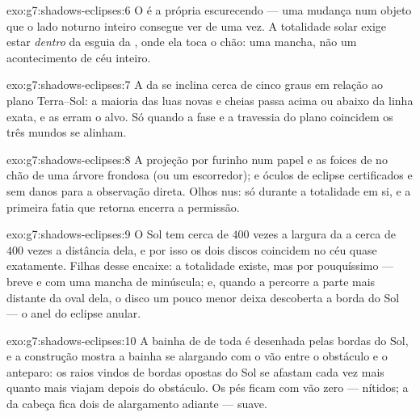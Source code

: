 \begin{solution}{exo:g7:shadows-eclipses:6}
O  é a própria  escurecendo --- uma mudança num
objeto que o lado noturno inteiro consegue ver de uma vez. A
totalidade solar exige estar \emph{dentro} da  esguia da ,
onde ela toca o chão: uma mancha, não um acontecimento de céu
inteiro.
\end{solution}

\begin{solution}{exo:g7:shadows-eclipses:7}
A  da  se inclina cerca de cinco graus em relação ao plano
Terra--Sol: a maioria das luas novas e cheias passa acima ou abaixo
da linha exata, e as  erram o alvo. Só quando a fase e a
travessia do plano coincidem os três mundos se alinham.
\end{solution}

\begin{solution}{exo:g7:shadows-eclipses:8}
A projeção por furinho num papel e as foices de  no chão de uma
árvore frondosa (ou um escorredor); e óculos de eclipse certificados
e sem danos para a observação direta. Olhos nus: só durante a
totalidade em si, e a primeira fatia que retorna encerra a
permissão.
\end{solution}

\begin{solution}{exo:g7:shadows-eclipses:9}
O Sol tem cerca de $400$ vezes a largura da  a cerca de $400$
vezes a distância dela, e por isso os dois discos coincidem no céu
quase exatamente. Filhas desse encaixe: a totalidade existe, mas por
pouquíssimo --- breve e com uma mancha de  minúscula; e, quando
a  percorre a parte mais distante da  oval dela, o disco um
pouco menor deixa descoberta a borda do Sol --- o anel do eclipse
anular.
\end{solution}

\begin{solution}{exo:g7:shadows-eclipses:10}
A bainha de  de toda  é desenhada pelas bordas do Sol,
e a construção mostra a bainha se alargando com o vão entre o
obstáculo e o anteparo: os raios vindos de bordas opostas do Sol se
afastam cada vez mais quanto mais viajam depois do obstáculo. Os pés
ficam com vão zero --- nítidos; a  da cabeça fica dois 
de alargamento adiante --- suave.
\end{solution}

